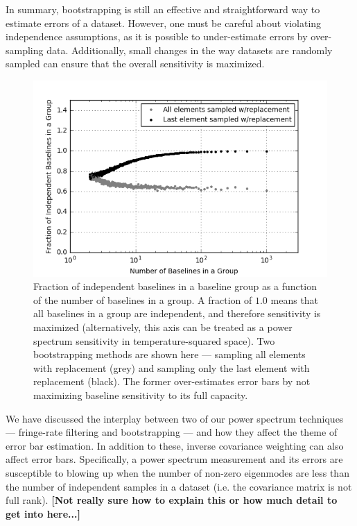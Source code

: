 \documentclass[preprint2,numberedappendix,tighten,twocolappendix]{aastex6}  %
\newcommand{\cc}[1]{{\color{purple} \textbf{[#1]}}}
\begin{document}
In summary, bootstrapping is still an effective and straightforward way to estimate errors of a dataset. However, one must be careful about violating independence assumptions, as it is possible to under-estimate errors by over-sampling data. Additionally, small changes in the way datasets are randomly sampled can ensure that the overall sensitivity is maximized.

\begin{figure}
	\centering
	\includegraphics[trim={0.3cm 0.3cm 0.3cm 0.3cm},width=\columnwidth]{plots/toy_error2.png}
	\caption{Fraction of independent baselines in a baseline group as a function of the number of baselines in a group. A fraction of $1.0$ means that all baselines in a group are independent, and therefore sensitivity is maximized (alternatively, this axis can be treated as a power spectrum sensitivity in temperature-squared space). Two bootstrapping methods are shown here --- sampling all elements with replacement (grey) and sampling only the last element with replacement (black). The former over-estimates error bars by not maximizing baseline sensitivity to its full capacity.}
	\label{fig:toy_error2}
\end{figure}

We have discussed the interplay between two of our power spectrum techniques --- fringe-rate filtering and bootstrapping --- and how they affect the theme of error bar estimation. In addition to these, inverse covariance weighting can also affect error bars. Specifically, a power spectrum measurement and its errors are susceptible to blowing up when the number of non-zero eigenmodes are less than the number of independent samples in a dataset (i.e. the covariance matrix is not full rank). \cc{Not really sure how to explain this or how much detail to get into here...}
\end{document}
